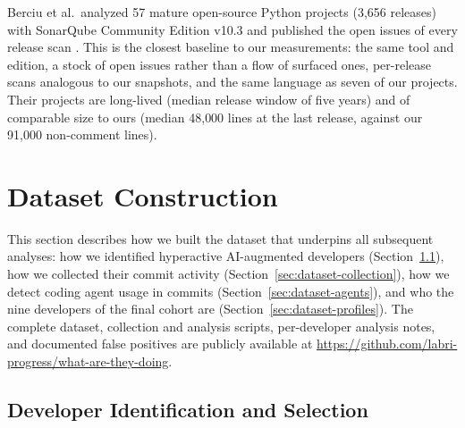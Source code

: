 \documentclass[smallextended]{svjour3}
\begin{document}
Berciu et al.\ analyzed 57 mature open-source Python projects (3{,}656
releases) with SonarQube Community Edition v10.3 and published the
open issues of every release scan \cite{berciu2026longterm,
berciu2026dataset}. This is the closest baseline to our measurements:
the same tool and edition, a stock of open issues rather than a flow
of surfaced ones, per-release scans analogous to our snapshots, and
the same language as seven of our projects. Their projects are
long-lived (median release window of five years) and of comparable
size to ours (median 48{,}000 lines at the last release, against our
91{,}000 non-comment lines).



\section{Dataset Construction}
\label{sec:dataset}

This section describes how we built the dataset that underpins all subsequent analyses: how we identified hyperactive AI-augmented developers (Section~\ref{sec:dataset-identification}), how we collected their commit activity (Section~\ref{sec:dataset-collection}), how we detect coding agent usage in commits (Section~\ref{sec:dataset-agents}), and who the nine developers of the final cohort are (Section~\ref{sec:dataset-profiles}).
The complete dataset, collection and analysis scripts, per-developer analysis notes, and documented false positives are publicly available at \url{https://github.com/labri-progress/what-are-they-doing}.

\subsection{Developer Identification and Selection}
\label{sec:dataset-identification}
\end{document}

